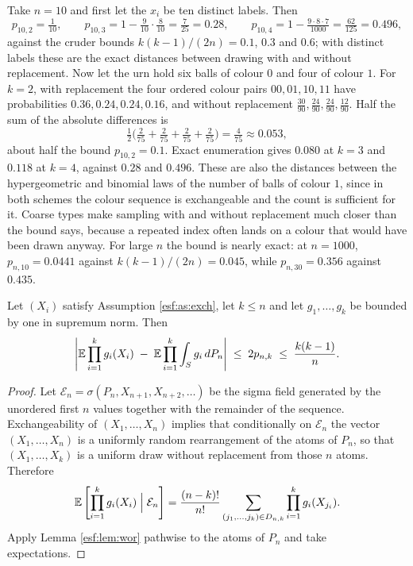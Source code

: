 \begin{example}
\label{esf:ex:tenballs}
Take $n = 10$ and first let the $x_i$ be ten distinct labels. Then
\[
p_{10,2} = \tfrac{1}{10}, \qquad
p_{10,3} = 1 - \tfrac{9}{10}\cdot\tfrac{8}{10} = \tfrac{7}{25} = 0.28, \qquad
p_{10,4} = 1 - \tfrac{9 \cdot 8 \cdot 7}{1000} = \tfrac{62}{125} = 0.496,
\]
against the cruder bounds $k(k-1)/(2n) = 0.1$, $0.3$ and $0.6$; with distinct labels
these are the exact distances between drawing with and without replacement. Now let
the urn hold six balls of colour $0$ and four of colour $1$. For $k = 2$, with
replacement the four ordered colour pairs $00, 01, 10, 11$ have probabilities
$0.36, 0.24, 0.24, 0.16$, and without replacement
$\tfrac{30}{90}, \tfrac{24}{90}, \tfrac{24}{90}, \tfrac{12}{90}$. Half the sum of the
absolute differences is
\[
\tfrac12 \bigl( \tfrac{2}{75} + \tfrac{2}{75} + \tfrac{2}{75} + \tfrac{2}{75} \bigr)
= \tfrac{4}{75} \approx 0.053,
\]
about half the bound $p_{10,2} = 0.1$. Exact enumeration gives $0.080$ at $k = 3$ and
$0.118$ at $k = 4$, against $0.28$ and $0.496$. These are also the distances between
the hypergeometric and binomial laws of the number of balls of colour $1$, since in
both schemes the colour sequence is exchangeable and the count is sufficient for it.
Coarse types make sampling with and without replacement much closer than the bound
says, because a repeated index often lands on a colour that would have been drawn
anyway. For large $n$ the bound is nearly exact: at $n = 1000$, $p_{n,10} = 0.0441$
against $k(k-1)/(2n) = 0.045$, while $p_{n,30} = 0.356$ against $0.435$.
\end{example}

\begin{lemma}
\label{esf:lem:reduce}
Let $(X_i)$ satisfy Assumption \ref{esf:as:exch}, let $k \le n$ and let $g_1,\dots,g_k$ be
bounded by one in supremum norm. Then
\[
\left| \mathbb{E} \prod_{i=1}^{k} g_i(X_i)
\; - \; \mathbb{E} \prod_{i=1}^{k} \int_S g_i \, dP_n \right| \; \le \; 2 p_{n,k}
\; \le \; \frac{k(k-1)}{n}.
\]
\end{lemma}

\begin{proof}
Let $\mathcal{E}_n = \sigma(P_n, X_{n+1}, X_{n+2}, \dots)$ be the sigma field generated
by the unordered first $n$ values together with the remainder of the sequence.
Exchangeability of $(X_1,\dots,X_n)$ implies that conditionally on $\mathcal{E}_n$ the
vector $(X_1,\dots,X_n)$ is a uniformly random rearrangement of the atoms of $P_n$,
so that $(X_1,\dots,X_k)$ is a uniform draw without replacement from those $n$ atoms.
Therefore
\[
\mathbb{E} \left[ \prod_{i=1}^{k} g_i(X_i) \;\Big|\; \mathcal{E}_n \right]
= \frac{(n-k)!}{n!} \sum_{(j_1,\dots,j_k) \in D_{n,k}} \prod_{i=1}^{k} g_i(X_{j_i}).
\]
Apply Lemma \ref{esf:lem:wor} pathwise to the atoms of $P_n$ and take expectations.
\end{proof}

